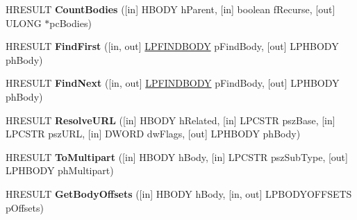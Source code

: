 \begin{DoxyCompactItemize}
\item 
\mbox{\label{interface_m_i_m_e_o_l_e_1_1_i_mime_message_tree_aaa773fa4c0a9a909ceb46f01887954a7}} 
H\+R\+E\+S\+U\+LT {\bfseries Count\+Bodies} (\mbox{[}in\mbox{]} H\+B\+O\+DY h\+Parent, \mbox{[}in\mbox{]} boolean f\+Recurse, \mbox{[}out\mbox{]} U\+L\+O\+NG $\ast$pc\+Bodies)
\item 
\mbox{\label{interface_m_i_m_e_o_l_e_1_1_i_mime_message_tree_a1e7ff083f734c3509738befabaaa1e55}} 
H\+R\+E\+S\+U\+LT {\bfseries Find\+First} (\mbox{[}in, out\mbox{]} \hyperlink{struct_m_i_m_e_o_l_e_1_1_i_mime_message_tree_1_1tag_f_i_n_d_b_o_d_y}{L\+P\+F\+I\+N\+D\+B\+O\+DY} p\+Find\+Body, \mbox{[}out\mbox{]} L\+P\+H\+B\+O\+DY ph\+Body)
\item 
\mbox{\label{interface_m_i_m_e_o_l_e_1_1_i_mime_message_tree_a4a88d9568d944c1399377bde5cca77ef}} 
H\+R\+E\+S\+U\+LT {\bfseries Find\+Next} (\mbox{[}in, out\mbox{]} \hyperlink{struct_m_i_m_e_o_l_e_1_1_i_mime_message_tree_1_1tag_f_i_n_d_b_o_d_y}{L\+P\+F\+I\+N\+D\+B\+O\+DY} p\+Find\+Body, \mbox{[}out\mbox{]} L\+P\+H\+B\+O\+DY ph\+Body)
\item 
\mbox{\label{interface_m_i_m_e_o_l_e_1_1_i_mime_message_tree_a4e4c71e5dd988344fd7fa9953c48cc63}} 
H\+R\+E\+S\+U\+LT {\bfseries Resolve\+U\+RL} (\mbox{[}in\mbox{]} H\+B\+O\+DY h\+Related, \mbox{[}in\mbox{]} L\+P\+C\+S\+TR psz\+Base, \mbox{[}in\mbox{]} L\+P\+C\+S\+TR psz\+U\+RL, \mbox{[}in\mbox{]} D\+W\+O\+RD dw\+Flags, \mbox{[}out\mbox{]} L\+P\+H\+B\+O\+DY ph\+Body)
\item 
\mbox{\label{interface_m_i_m_e_o_l_e_1_1_i_mime_message_tree_a7826c958acf06bd1cd80354c7a25a5f9}} 
H\+R\+E\+S\+U\+LT {\bfseries To\+Multipart} (\mbox{[}in\mbox{]} H\+B\+O\+DY h\+Body, \mbox{[}in\mbox{]} L\+P\+C\+S\+TR psz\+Sub\+Type, \mbox{[}out\mbox{]} L\+P\+H\+B\+O\+DY ph\+Multipart)
\item 
\mbox{\label{interface_m_i_m_e_o_l_e_1_1_i_mime_message_tree_a1ce65d3add5509e794cf6b69cab4dcc7}} 
H\+R\+E\+S\+U\+LT {\bfseries Get\+Body\+Offsets} (\mbox{[}in\mbox{]} H\+B\+O\+DY h\+Body, \mbox{[}in, out\mbox{]} L\+P\+B\+O\+D\+Y\+O\+F\+F\+S\+E\+TS p\+Offsets)

\end{DoxyCompactItemize}
